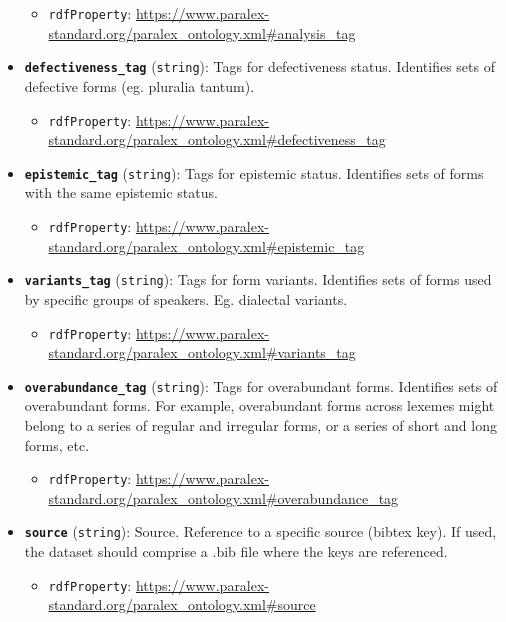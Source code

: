 \begin{itemize}
  \begin{itemize}
  \tightlist
  \item
    \texttt{rdfProperty}:
    \url{https://www.paralex-standard.org/paralex_ontology.xml\#analysis_tag}
  \end{itemize}
\item
  \textbf{\texttt{defectiveness\_tag}} (\texttt{string}): Tags for
  defectiveness status. Identifies sets of defective forms (eg. pluralia
  tantum).

  \begin{itemize}
  \tightlist
  \item
    \texttt{rdfProperty}:
    \url{https://www.paralex-standard.org/paralex_ontology.xml\#defectiveness_tag}
  \end{itemize}
\item
  \textbf{\texttt{epistemic\_tag}} (\texttt{string}): Tags for epistemic
  status. Identifies sets of forms with the same epistemic status.

  \begin{itemize}
  \tightlist
  \item
    \texttt{rdfProperty}:
    \url{https://www.paralex-standard.org/paralex_ontology.xml\#epistemic_tag}
  \end{itemize}
\item
  \textbf{\texttt{variants\_tag}} (\texttt{string}): Tags for form
  variants. Identifies sets of forms used by specific groups of
  speakers. Eg. dialectal variants.

  \begin{itemize}
  \tightlist
  \item
    \texttt{rdfProperty}:
    \url{https://www.paralex-standard.org/paralex_ontology.xml\#variants_tag}
  \end{itemize}
\item
  \textbf{\texttt{overabundance\_tag}} (\texttt{string}): Tags for
  overabundant forms. Identifies sets of overabundant forms. For
  example, overabundant forms across lexemes might belong to a series of
  regular and irregular forms, or a series of short and long forms, etc.

  \begin{itemize}
  \tightlist
  \item
    \texttt{rdfProperty}:
    \url{https://www.paralex-standard.org/paralex_ontology.xml\#overabundance_tag}
  \end{itemize}
\item
  \textbf{\texttt{source}} (\texttt{string}): Source. Reference to a
  specific source (bibtex key). If used, the dataset should comprise a
  .bib file where the keys are referenced.

  \begin{itemize}
  \tightlist
  \item
    \texttt{rdfProperty}:
    \url{https://www.paralex-standard.org/paralex_ontology.xml\#source}
  \end{itemize}
\end{itemize}

